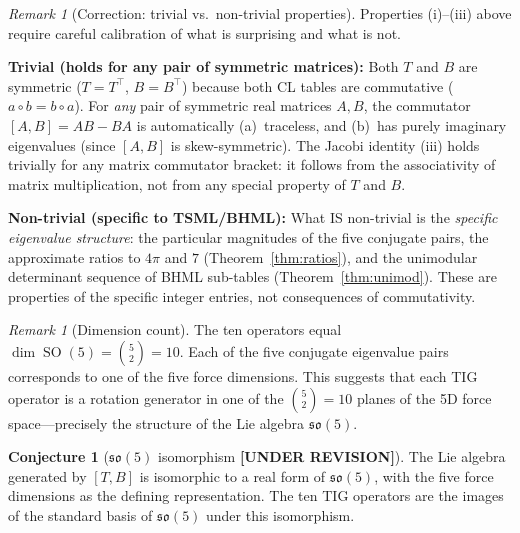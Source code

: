\documentclass[11pt]{article}
\theoremstyle{definition}
\newtheorem{conjecture}[theorem]{Conjecture}
\theoremstyle{remark}
\newtheorem{remark}[theorem]{Remark}
\begin{document}
\begin{remark}[Correction: trivial vs.\ non-trivial properties]
\label{rem:lie-correction}
Properties (i)--(iii) above require careful calibration of what is surprising
and what is not.

\textbf{Trivial (holds for any pair of symmetric matrices):}
Both $T$ and $B$ are symmetric ($T = T^\top$, $B = B^\top$) because both CL
tables are commutative ($a \circ b = b \circ a$).  For \emph{any} pair of
symmetric real matrices $A, B$, the commutator $[A,B] = AB - BA$ is
automatically (a)~traceless, and (b)~has purely imaginary eigenvalues (since
$[A,B]$ is skew-symmetric).  The Jacobi identity (iii) holds trivially for any
matrix commutator bracket: it follows from the associativity of matrix
multiplication, not from any special property of $T$ and $B$.

\textbf{Non-trivial (specific to TSML/BHML):}
What IS non-trivial is the \emph{specific eigenvalue structure}: the particular
magnitudes of the five conjugate pairs, the approximate ratios to $4\pi$ and
$7$ (Theorem~\ref{thm:ratios}), and the unimodular determinant sequence of BHML
sub-tables (Theorem~\ref{thm:unimod}).  These are properties of the specific
integer entries, not consequences of commutativity.
\end{remark}

\begin{remark}[Dimension count]
The ten operators equal $\dim\!\operatorname{SO}(5) = \binom{5}{2} = 10$.  Each
of the five conjugate eigenvalue pairs corresponds to one of the five force
dimensions.  This suggests that each TIG operator is a rotation generator in
one of the $\binom{5}{2}=10$ planes of the 5D force space---precisely the
structure of the Lie algebra $\mathfrak{so}(5)$.
\end{remark}

\begin{conjecture}[$\mathfrak{so}(5)$ isomorphism {\normalfont\textbf{[UNDER REVISION]}}]
\label{conj:so5}
The Lie algebra generated by $[T,B]$ is isomorphic to a real form of
$\mathfrak{so}(5)$, with the five force dimensions as the defining
representation.  The ten TIG operators are the images of the standard basis of
$\mathfrak{so}(5)$ under this isomorphism.
\end{conjecture}
\end{document}
